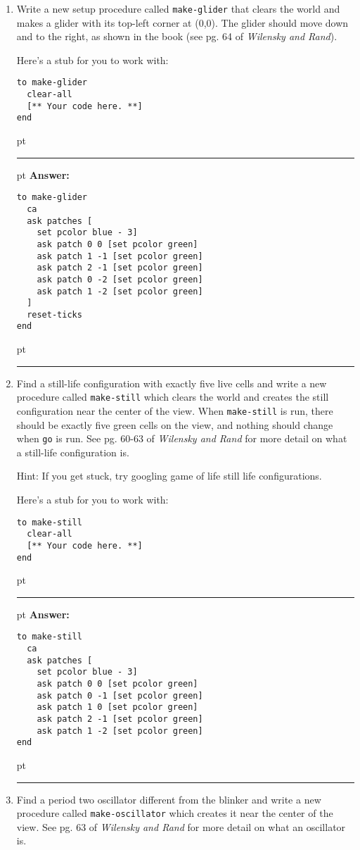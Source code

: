 \documentclass[11pt,oneside]{book}
\begin{document}
\begin{enumerate}
\item Write a new setup procedure called \texttt{make-glider} that clears the world and makes a glider with its top-left corner at (0,0). The glider should move down and to the right, as shown in the book (see pg. 64 of {\it Wilensky and Rand}).

Here's a stub for you to work with:
\begin{verbatim}
to make-glider
  clear-all
  [** Your code here. **]
end
\end{verbatim}

\ifnum{}
 pt
\hrule
{} pt
{\bf Answer: }
\begin{verbatim}
to make-glider
  ca 
  ask patches [
    set pcolor blue - 3]
    ask patch 0 0 [set pcolor green]
    ask patch 1 -1 [set pcolor green]
    ask patch 2 -1 [set pcolor green]
    ask patch 0 -2 [set pcolor green]
    ask patch 1 -2 [set pcolor green]
  ]
  reset-ticks
end
\end{verbatim}
 pt
\hrule
\fi

\item Find a still-life configuration with exactly five live cells and write a new procedure called \texttt{make-still} which clears the world and creates the still configuration near the center of the view. When \texttt{make-still} is run, there should be exactly five green cells on the view, and nothing should change when \texttt{go} is run. See pg. 60-63 of {\it Wilensky and Rand} for more detail on what a still-life configuration is.

Hint: If you get stuck, try googling game of life still life configurations.

Here's a stub for you to work with:
\begin{verbatim}
to make-still
  clear-all
  [** Your code here. **]
end
\end{verbatim}

\ifnum{}
 pt
\hrule
{} pt
{\bf Answer: }
\begin{verbatim}
to make-still
  ca 
  ask patches [
    set pcolor blue - 3]
    ask patch 0 0 [set pcolor green]
    ask patch 0 -1 [set pcolor green]
    ask patch 1 0 [set pcolor green]
    ask patch 2 -1 [set pcolor green]
    ask patch 1 -2 [set pcolor green]
end
\end{verbatim}
 pt
\hrule
\fi

\item Find a period two oscillator different from the blinker and write a new procedure called \texttt{make-oscillator} which creates it near the center of the view. See pg. 63 of {\it Wilensky and Rand} for more detail on what an oscillator is.


\end{enumerate}
\end{document}
